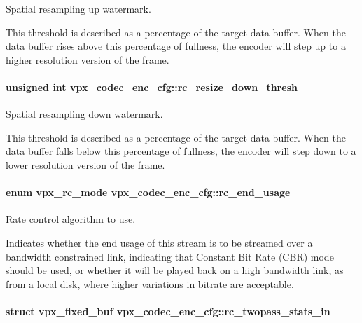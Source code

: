 Spatial resampling up watermark. 

This threshold is described as a percentage of the target data buffer. When the data buffer rises above this percentage of fullness, the encoder will step up to a higher resolution version of the frame. \hypertarget{structvpx__codec__enc__cfg_a1be7bd7b0eaf1e99b5e4028c37c65488}{
\paragraph[{rc\+\_\+resize\+\_\+down\+\_\+thresh}]{\setlength{\rightskip}{0pt plus 5cm}unsigned int vpx\+\_\+codec\+\_\+enc\+\_\+cfg\+::rc\+\_\+resize\+\_\+down\+\_\+thresh}}\label{structvpx__codec__enc__cfg_a1be7bd7b0eaf1e99b5e4028c37c65488}


Spatial resampling down watermark. 

This threshold is described as a percentage of the target data buffer. When the data buffer falls below this percentage of fullness, the encoder will step down to a lower resolution version of the frame. \hypertarget{structvpx__codec__enc__cfg_a99c415edb6c6f909a095a57c3430a116}{
\paragraph[{rc\+\_\+end\+\_\+usage}]{\setlength{\rightskip}{0pt plus 5cm}enum {\bf vpx\+\_\+rc\+\_\+mode} vpx\+\_\+codec\+\_\+enc\+\_\+cfg\+::rc\+\_\+end\+\_\+usage}}\label{structvpx__codec__enc__cfg_a99c415edb6c6f909a095a57c3430a116}


Rate control algorithm to use. 

Indicates whether the end usage of this stream is to be streamed over a bandwidth constrained link, indicating that Constant Bit Rate (C\+B\+R) mode should be used, or whether it will be played back on a high bandwidth link, as from a local disk, where higher variations in bitrate are acceptable. \hypertarget{structvpx__codec__enc__cfg_a618616a07d9d8883c544731957b56f3c}{
\paragraph[{rc\+\_\+twopass\+\_\+stats\+\_\+in}]{\setlength{\rightskip}{0pt plus 5cm}struct {\bf vpx\+\_\+fixed\+\_\+buf} vpx\+\_\+codec\+\_\+enc\+\_\+cfg\+::rc\+\_\+twopass\+\_\+stats\+\_\+in}}\label{structvpx__codec__enc__cfg_a618616a07d9d8883c544731957b56f3c}


